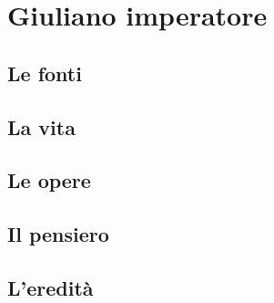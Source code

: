 \chapter{Giuliano imperatore}

\section{Le fonti}

\section{La vita}

\section{Le opere}

\section{Il pensiero}

\section{L'eredità}
